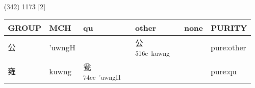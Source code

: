 \documentclass[14pt,a4paper]{scrartcl}
\begin{document}
(342) 1173 {[}2{]}

\begin{longtable}[c]{@{}llllll@{}}
\toprule
\begin{minipage}[b]{0.14\columnwidth}\raggedright\strut
GROUP
\strut\end{minipage} &
\begin{minipage}[b]{0.14\columnwidth}\raggedright\strut
MCH
\strut\end{minipage} &
\begin{minipage}[b]{0.14\columnwidth}\raggedright\strut
qu
\strut\end{minipage} &
\begin{minipage}[b]{0.14\columnwidth}\raggedright\strut
other
\strut\end{minipage} &
\begin{minipage}[b]{0.14\columnwidth}\raggedright\strut
none
\strut\end{minipage} &
\begin{minipage}[b]{0.14\columnwidth}\raggedright\strut
PURITY
\strut\end{minipage}\tabularnewline
\midrule
\endhead
\begin{minipage}[t]{0.14\columnwidth}\raggedright\strut
公
\strut\end{minipage} &
\begin{minipage}[t]{0.14\columnwidth}\raggedright\strut
'uwngH
\strut\end{minipage} &
\begin{minipage}[t]{0.14\columnwidth}\raggedright\strut
\strut\end{minipage} &
\begin{minipage}[t]{0.14\columnwidth}\raggedright\strut
公\textsuperscript{516c~kuwng}
\strut\end{minipage} &
\begin{minipage}[t]{0.14\columnwidth}\raggedright\strut
\strut\end{minipage} &
\begin{minipage}[t]{0.14\columnwidth}\raggedright\strut
pure:other
\strut\end{minipage}\tabularnewline
\begin{minipage}[t]{0.14\columnwidth}\raggedright\strut
雍
\strut\end{minipage} &
\begin{minipage}[t]{0.14\columnwidth}\raggedright\strut
kuwng
\strut\end{minipage} &
\begin{minipage}[t]{0.14\columnwidth}\raggedright\strut
瓮\textsuperscript{74ee~'uwngH}
\strut\end{minipage} &
\begin{minipage}[t]{0.14\columnwidth}\raggedright\strut
\strut\end{minipage} &
\begin{minipage}[t]{0.14\columnwidth}\raggedright\strut
\strut\end{minipage} &
\begin{minipage}[t]{0.14\columnwidth}\raggedright\strut
pure:qu
\strut\end{minipage}\tabularnewline
\bottomrule
\end{longtable}
\end{document}
